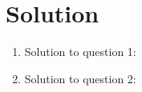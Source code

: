 \section*{Solution}

\begin{enumerate}

\item Solution to question 1:


\item Solution to question 2:


\end{enumerate}




